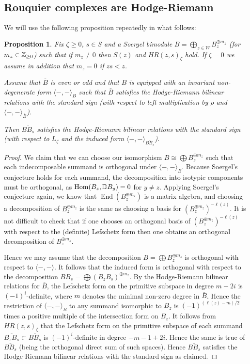 \documentclass[11pt]{amsart}
\numberwithin{equation}{section}
\def\BS{{\EuScript B}}
\def\z{\zeta}
\DeclareMathOperator{\End}{End} %
\newtheorem{prop}[thm]{Proposition}
\theoremstyle{definition}
\theoremstyle{remark}
\begin{document}
{\subsection{Rouquier complexes are Hodge-Riemann} \label{sec:RHR}
We will use the
following proposition repeatedly in what follows:

\begin{prop} \label{prop:sumHR=>HR}
Fix $\z \ge 0$, $s \in S$ and a Soergel bimodule $B =
  \bigoplus_{z \in W} B_z^{\oplus m_z}$ (for $m_z \in
    {\mathbb{Z}}_{\ge 0}$) such that if $m_z \ne 0$ then $S(z)$
  and $HR(z,s)_\z$ hold. If $\z = 0$ we assume in addition that $m_z
  = 0$ if $zs < z$.

Assume that $\overline{B}$ is even or odd and
  that $B$
  is equipped with an invariant non-degenerate form $\langle -, -
  \rangle_B$ such that $\overline{B}$ satisfies the Hodge-Riemann
  bilinear relations with the standard sign (with respect to left
  multiplication by $\rho$ and $\langle
  -, - \rangle_{\overline{B}}$).

Then $\overline{BB_s}$ satisfies the
  Hodge-Riemann bilinear relations with the standard sign (with
  respect to $L_\z$ and the induced form $\langle - , -
  \rangle_{\overline{BB_s}}$).
\end{prop}

\begin{proof} We claim that we can choose our isomorphism $B \cong
  \bigoplus B_z^{\oplus m_z}$ such that each indecomposable summand is orthogonal
  under $\langle -, - \rangle_B$. Because Soergel's conjecture
  holds for each summand, the decomposition into isotypic components
  must be orthogonal, as $\operatorname{Hom}(B_z,{\mathbb{D}} B_y)=0$ for $y \ne
  z$. Applying Soergel's conjecture again, we know that $\End(B_z^{\oplus
    m_z})$ is a matrix algebra, and choosing a decomposition of
  $B_z^{\oplus m_z}$ is the same as choosing a basis for $(B_z^{\oplus m_z})^{-\ell(z)}$. It is not difficult to check
  that if one chooses an orthogonal basis of
  $(B_z^{\oplus m_z})^{-\ell(z)}$ with respect to the (definite)
  Lefschetz form then one obtains an orthogonal decomposition of $B_z^{\oplus
    m_z}$.

Hence we may assume that the decomposition $B = \bigoplus B_z^{\oplus
  m_z}$ is orthogonal with respect to $\langle -, - \rangle$. It
follows that the induced form is orthogonal with respect to the
decomposition $BB_s = \bigoplus (B_zB_s)^{\oplus m_z}$. By the
Hodge-Riemann bilinear relations for $\overline{B}$, the
Lefschetz form on the primitive subspace in degree $m + 2i$ is
$(-1)^{i}$-definite, where $m$ denotes the minimal non-zero degree in
$\overline{B}$. Hence the restriction of $\langle -, - \rangle_{B}$ to
any summand isomorphic to $B_z$ is $(-1)^{(\ell(z) - m)/2}$ times a
positive multiple of the intersection form on $B_z$. It follows
from $HR(z,s)_{\z}$ that the Lefschetz form on the primitive subspace of
each summand $\overline{B_zB_s} \subset \overline{BB_s}$ is $(-1)^i$-definite in degree $-m-1 + 2i$. Hence the same is
true of $\overline{BB_s}$ (being the orthogonal direct sum of such
spaces). Hence $\overline{BB_s}$ satisfies the Hodge-Riemann bilinear
relations with the standard sign as claimed.
\end{proof}

}
\end{document}
